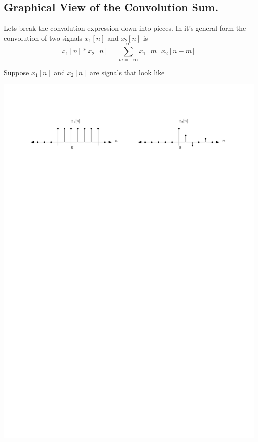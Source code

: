 \subsection{Graphical View of the Convolution Sum.}

Lets break the convolution expression down into pieces. In it's general form the convolution of two signals $x_1[n]$ and $x_2[n]$ is
\[
x_1[n] * x_2[n] = \sum\limits_{m = -\infty}^{\infty} x_1[m]x_2[n-m]
\]

Suppose $x_1[n]$ and $x_2[n]$ are signals that look like
\begin{center}
  \includegraphics[scale=1]{graphics/dtconvolution-explain1.pdf}
\end{center}

